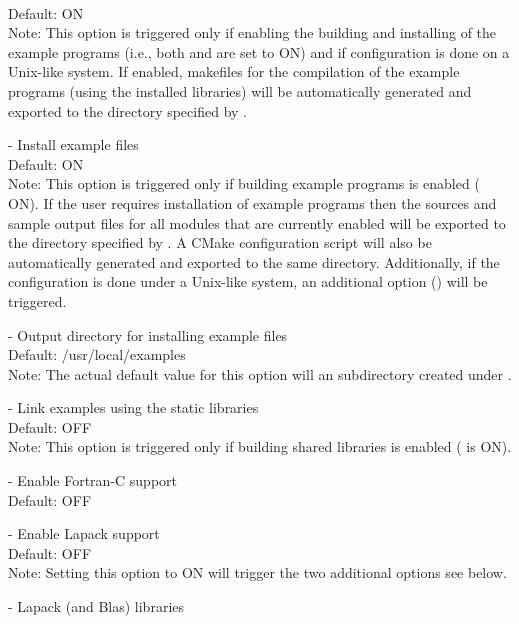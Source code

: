 \begin{description}
  \\
  Default: ON
  \\
  Note: This option is triggered only if enabling the building and installing of
  the example programs (i.e., both  and 
  are set to ON) and if configuration is done on a Unix-like system. If enabled,
  makefiles for the compilation of the example programs (using the installed
  {\sundials} libraries) will be automatically generated and exported to the directory
  specified by .
\item[\id{EXAMPLES\_INSTALL}] - 
  Install example files
  \\
  Default: ON
  \\
  Note: This option is triggered only if building example programs
  is enabled ( ON). If the user requires
  installation of example programs then the sources and sample output files
  for all {\sundials} modules that are currently enabled will be exported to
  the directory specified by . A CMake configuration
  script will also be automatically generated and exported to the same directory.
  Additionally, if the configuration is done under a Unix-like system, an additional
  option () will be triggered.
\item[\id{EXAMPLES\_INSTALL\_PATH}] - 
  Output directory for installing example files
  \\
  Default: /usr/local/examples
  \\
  Note: The actual default value for this option will an 
  subdirectory created under .
\item[\id{EXAMPLES\_USE\_STATIC\_LIBS}] - 
  Link examples using the static libraries
  \\
  Default: OFF
  \\
  Note: This option is triggered only if building shared
  libraries is enabled ( is ON).
\item[\id{FCMIX\_ENABLE}] - 
  Enable Fortran-C support   
  \\
  Default: OFF 
\item[\id{LAPACK\_ENABLE}] -  
  Enable Lapack support
  \\
  Default: OFF
  \\
  Note: Setting this option to ON will trigger the two additional options
  see below.
\item[\id{LAPACK\_LIBRARIES}] - 
  Lapack (and Blas) libraries

\end{description}
